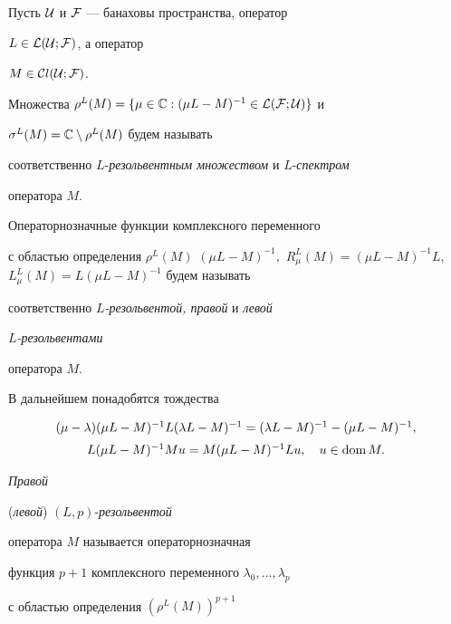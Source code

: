 Пусть ${\cal U}$ и ${\cal F}$ --- банаховы пространства, оператор


$L\in{\cal L(\cal U;\cal F)}$, а оператор


$M\in{\cal C}l{(\cal U;\cal F)}$.


Множества $\rho^L(M)=\{\mu\in{\Bbb C}:(\mu L-M)^{-1}\in{\cal


L(\cal F;\cal U)}\}$ и


$\sigma^L(M)={\Bbb C}\setminus\rho^L(M)$ будем называть


соответственно $L$-{\it резольвентным множеством} и $L$-{\it спектром}


оператора $M$.


Операторнозначные функции комплексного переменного


с областью определения $\rho^L(M)$ $ (\mu L-M)^{-1},$ $R_{\mu }^L(M)


=(\mu L-M)^{-1}L$, $L_{\mu }^L(M)=L(\mu L-M)^{-1}$ будем называть


соответственно $L${\it -резольвентой, правой} и {\it левой}


$L${\it-резольвентами}


оператора $M$.





В дальнейшем понадобятся тождества


\begin{equation}


\begin{array}{c}


(\mu -\lambda )(\mu L-M)^{-1}L(\lambda L-M)^{-1}=(\lambda L-M)^{-1}-


(\mu L-M)^{-1}, \\[2mm]


L(\mu L-M)^{-1}Mu=M(\mu L-M)^{-1}Lu,\quad u\in\dom M.


\end{array}


\end{equation}





{\it Правой }


({\it левой}) $(L,p)$-{\it резольвентой}


оператора $M$ называется операторнозначная


функция $p+1$ комплексного переменного $\lambda _0,\dotsc,\lambda _p$


с областью определения $(\rho^L(M))^{p+1}$


